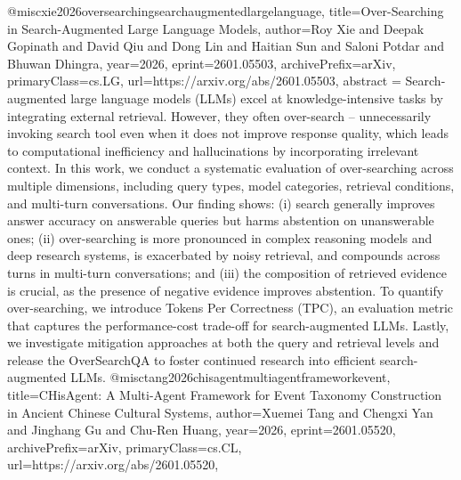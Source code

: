 {}@misc{xie2026oversearchingsearchaugmentedlargelanguage,
      title={Over-Searching in Search-Augmented Large Language Models}, 
      author={Roy Xie and Deepak Gopinath and David Qiu and Dong Lin and Haitian Sun and Saloni Potdar and Bhuwan Dhingra},
      year={2026},
      eprint={2601.05503},
      archivePrefix={arXiv},
      primaryClass={cs.LG},
      url={https://arxiv.org/abs/2601.05503},
      abstract = {Search-augmented large language models (LLMs) excel at knowledge-intensive tasks by integrating external retrieval. However, they often over-search -- unnecessarily invoking search tool even when it does not improve response quality, which leads to computational inefficiency and hallucinations by incorporating irrelevant context. In this work, we conduct a systematic evaluation of over-searching across multiple dimensions, including query types, model categories, retrieval conditions, and multi-turn conversations. Our finding shows: (i) search generally improves answer accuracy on answerable queries but harms abstention on unanswerable ones; (ii) over-searching is more pronounced in complex reasoning models and deep research systems, is exacerbated by noisy retrieval, and compounds across turns in multi-turn conversations; and (iii) the composition of retrieved evidence is crucial, as the presence of negative evidence improves abstention. To quantify over-searching, we introduce Tokens Per Correctness (TPC), an evaluation metric that captures the performance-cost trade-off for search-augmented LLMs. Lastly, we investigate mitigation approaches at both the query and retrieval levels and release the OverSearchQA to foster continued research into efficient search-augmented LLMs.}
}@misc{tang2026chisagentmultiagentframeworkevent,
      title={CHisAgent: A Multi-Agent Framework for Event Taxonomy Construction in Ancient Chinese Cultural Systems}, 
      author={Xuemei Tang and Chengxi Yan and Jinghang Gu and Chu-Ren Huang},
      year={2026},
      eprint={2601.05520},
      archivePrefix={arXiv},
      primaryClass={cs.CL},
      url={https://arxiv.org/abs/2601.05520},
}
